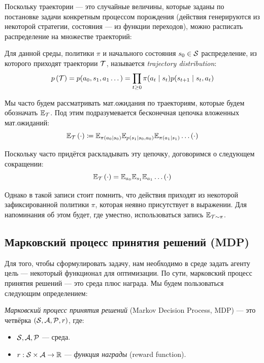 Поскольку траектории --- это случайные величины, которые заданы по постановке задачи конкретным процессом порождения (действия генерируются из некоторой стратегии, состояния --- из функции переходов), можно расписать распределение на множестве траекторий:

\begin{definition} 
Для данной среды, политики $\pi$ и начального состояния $s_0 \HM\in \St$ распределение, из которого приходят траектории $\mathcal{T}$, называется \emph{trajectory distribution}:
$$p\left(\mathcal{T} \right) = p(a_0, s_1, a_1 \dots) = \prod_{t \ge 0} \pi(a_t \mid s_t) p(s_{t+1} \mid s_t, a_t)$$
\end{definition}

Мы часто будем рассматривать мат.ожидания по траекториям, которые будем обозначать $\mathbb{E}_{\mathcal{T}}$. Под этим подразумевается бесконечная цепочка вложенных мат.ожиданий:
\begin{equation}\label{traj_expectation}
\mathbb{E}_{\mathcal{T}} \left( \cdot \right) \coloneqq \mathbb{E}_{\pi(a_0 \mid s_0)}\mathbb{E}_{p(s_1 \mid s_0, a_0)}\mathbb{E}_{\pi(a_1 \mid s_1)} \dots \left( \cdot \right)
\end{equation}

Поскольку часто придётся раскладывать эту цепочку, договоримся о следующем сокращении:
$$\mathbb{E}_{\mathcal{T}} \left( \cdot \right) = \mathbb{E}_{a_0}\mathbb{E}_{s_1}\mathbb{E}_{a_1} \dots \left( \cdot \right)$$

Однако в такой записи стоит помнить, что действия приходят из некоторой зафиксированной политики $\pi$, которая неявно присутствует в выражении. Для напоминания об этом будет, где уместно, использоваться запись $\mathbb{E}_{\mathcal{T} \sim \pi}$.

\subsection{Марковский процесс принятия решений (MDP)}

Для того, чтобы сформулировать задачу, нам необходимо в среде задать агенту цель --- некоторый функционал для оптимизации. По сути, марковский процесс принятия решений --- это среда плюс награда. Мы будем пользоваться следующим определением:

\begin{definition} 
\emph{Марковский процесс принятия решений} (Markov Decision Process, MDP) --- это четвёрка $(\mathcal{S}, \mathcal{A}, \mathcal{P}, r)$, где: 
\begin{itemize}
    \item $\mathcal{S}, \mathcal{A}, \mathcal{P}$ --- среда.
    \item $r: \mathcal{S} \times \mathcal{A} \to \mathbb{R}$ --- \emph{функция награды} (reward function).
\end{itemize}
\end{definition}

